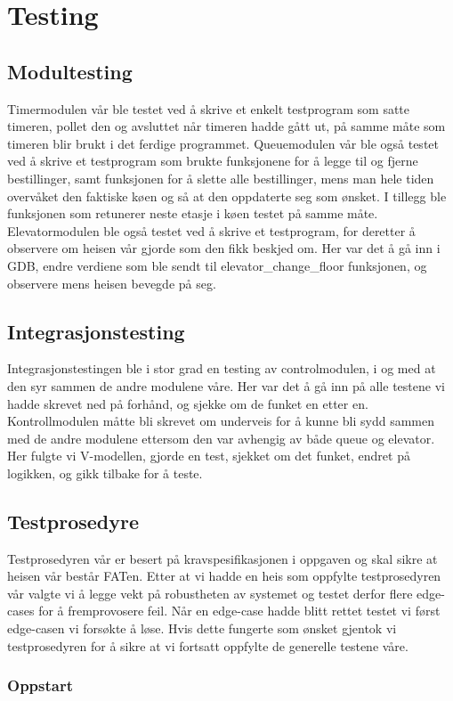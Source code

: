 \documentclass{article}
\begin{document}
\section{Testing}
\subsection{Modultesting}
Timermodulen vår ble testet ved å skrive et enkelt testprogram som satte timeren, pollet den og avsluttet når timeren hadde gått ut, på samme måte som timeren blir brukt i det ferdige programmet. Queuemodulen vår ble også testet ved å skrive et testprogram som brukte funksjonene for å legge til og fjerne bestillinger, samt funksjonen for å slette alle bestillinger, mens man hele tiden overvåket den faktiske køen og så at den oppdaterte seg som ønsket. I tillegg ble funksjonen som retunerer neste etasje i køen testet på samme måte. Elevatormodulen ble også testet ved å skrive et testprogram, for deretter å observere om heisen vår gjorde som den fikk beskjed om. Her var det å gå inn i GDB, endre verdiene som ble sendt til elevator\_change\_floor funksjonen, og observere mens heisen bevegde på seg.
\subsection{Integrasjonstesting}
Integrasjonstestingen ble i stor grad en testing av controlmodulen, i og med at den syr sammen de andre modulene våre. Her var det å gå inn på alle testene vi hadde skrevet ned på forhånd, og sjekke om de funket en etter en. Kontrollmodulen måtte bli skrevet om underveis for å kunne bli sydd sammen med de andre modulene ettersom den var avhengig av både queue og elevator. Her fulgte vi V-modellen, gjorde en test, sjekket om det funket, endret på logikken, og gikk tilbake for å teste.
\subsection{Testprosedyre}
Testprosedyren vår er besert på kravspesifikasjonen i oppgaven og skal sikre at heisen vår består FATen. Etter at vi hadde en heis som oppfylte testprosedyren vår valgte vi å legge vekt på robustheten av systemet og testet derfor flere edge-cases for å fremprovosere feil. Når en edge-case hadde blitt rettet testet vi først edge-casen vi forsøkte å løse. Hvis dette fungerte som ønsket gjentok vi testprosedyren for å sikre at vi fortsatt oppfylte de generelle testene våre. 

\newpage
\subsubsection{Oppstart}
\end{document}
